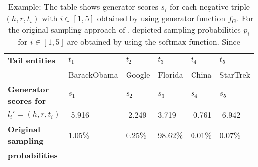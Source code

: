 \begin{table}[h]
    \centering
    \begin{tabular}{llllll}
        \toprule
        
        \textbf{Tail entities}
        & \textbf{$t_1$} & \textbf{$t_2$} & \textbf{$t_3$} & \textbf{$t_4$} & \textbf{$t_5$} \\
         
        & BarackObama 
        & Google 
        & Florida
        & China 
        & StarTrek \\

        \midrule
        
        \textbf{Generator scores for}
        & $s_1$ & $s_2$ & $s_3$ & $s_4$ & $s_5$ \\
       
        
        \textbf{$l_i' = (h, r, t_i)$}
        & -5.916 
        & -2.249  
        & 3.719 
        & -0.761 
        & -6.942 \\
        
         \midrule
        
        \textbf{Original sampling}
         & 1.05\%
        & 0.25\% 
        & 98.62\%  
        & 0.01\% 
        & 0.07\% \\
        
       \textbf{probabilities} 
       & & &  & &  \\
        \bottomrule
    \end{tabular}
    \caption{Example: The table shows generator scores 
    $s_i$ for each negative triple $(h,r,t_i)$ with $i \in [1,5]$ obtained by using generator function $f_G$.
    For the original sampling approach of \kbgan, depicted sampling probabilities $p_i$ for $i \in [1,5]$ are obtained by using the softmax function.
    Since }
\label{tab:generator_scores}
\end{table}